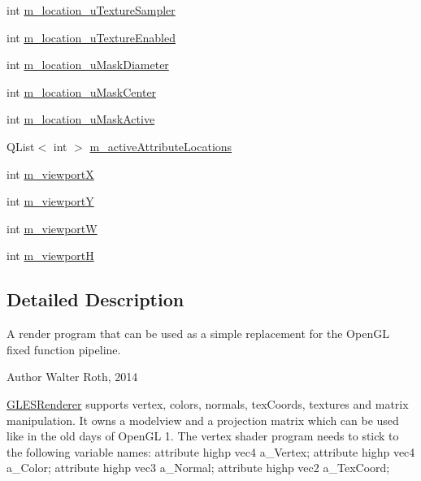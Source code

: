 \begin{DoxyCompactItemize}
\item 
int \mbox{\hyperlink{class_g_l_e_s_renderer_ac2f2a0039e1b58fbd7d5abd3c43640bc}{m\+\_\+location\+\_\+u\+Texture\+Sampler}}
\item 
int \mbox{\hyperlink{class_g_l_e_s_renderer_a82f6728d7361a42c33f0e88be7a329a2}{m\+\_\+location\+\_\+u\+Texture\+Enabled}}
\item 
int \mbox{\hyperlink{class_g_l_e_s_renderer_a60785985120438561f095a5d0bb0a0e6}{m\+\_\+location\+\_\+u\+Mask\+Diameter}}
\item 
int \mbox{\hyperlink{class_g_l_e_s_renderer_aa5865237289b4b166ccdcee4fafeefa7}{m\+\_\+location\+\_\+u\+Mask\+Center}}
\item 
int \mbox{\hyperlink{class_g_l_e_s_renderer_ac7d1efb2e83cebe39608a9816856da64}{m\+\_\+location\+\_\+u\+Mask\+Active}}
\item 
Q\+List$<$ int $>$ \mbox{\hyperlink{class_g_l_e_s_renderer_a923229687ee02d0364a7e472fa1ed578}{m\+\_\+active\+Attribute\+Locations}}
\item 
int \mbox{\hyperlink{class_g_l_e_s_renderer_a437c4d81da1b944458b4abde903c23ce}{m\+\_\+viewportX}}
\item 
int \mbox{\hyperlink{class_g_l_e_s_renderer_a0e81b88aa0c613e99dc6be1737d83c93}{m\+\_\+viewportY}}
\item 
int \mbox{\hyperlink{class_g_l_e_s_renderer_af839e0f722a97a026d7517de19acd352}{m\+\_\+viewportW}}
\item 
int \mbox{\hyperlink{class_g_l_e_s_renderer_a07da628f9769b11914946d71b71a4665}{m\+\_\+viewportH}}
\end{DoxyCompactItemize}


\subsection{Detailed Description}
A render program that can be used as a simple replacement for the Open\+GL fixed function pipeline. 

\begin{DoxyAuthor}{Author}
Walter Roth, 2014
\end{DoxyAuthor}
\mbox{\hyperlink{class_g_l_e_s_renderer}{G\+L\+E\+S\+Renderer}} supports vertex, colors, normals, tex\+Coords, textures and matrix manipulation. It owns a modelview and a projection matrix which can be used like in the old days of Open\+GL 1. The vertex shader program needs to stick to the following variable names\+: attribute highp vec4 a\+\_\+\+Vertex; attribute highp vec4 a\+\_\+\+Color; attribute highp vec3 a\+\_\+\+Normal; attribute highp vec2 a\+\_\+\+Tex\+Coord;

